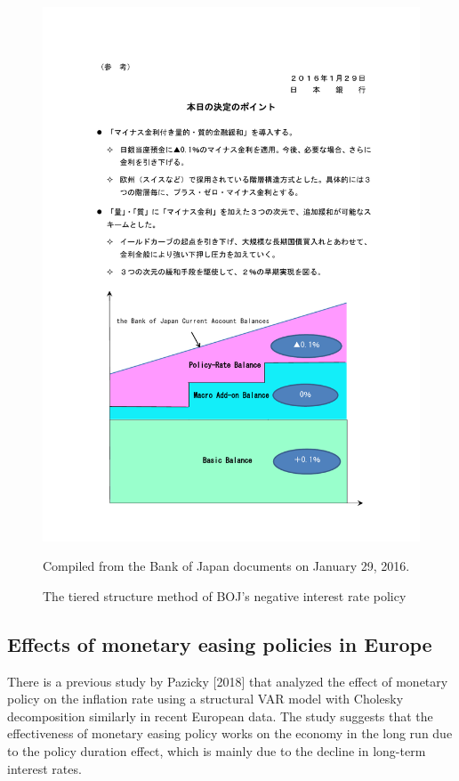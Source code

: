 \documentclass[12pt]{article}
\begin{document}
\begin{figure}[H]
    \centering
    \caption{The tiered structure method of BOJ's negative interest rate policy}
    \includegraphics[width=17cm]{currentaccount.pdf}
    
    Compiled from the Bank of Japan documents on January 29, 2016.
\end{figure}

\newpage
\subsection{Effects of monetary easing policies in Europe}

There is a previous study by Pazicky [2018] that analyzed the effect of monetary policy on the inflation rate using a structural VAR model with Cholesky decomposition similarly in recent European data.
The study suggests that the effectiveness of monetary easing policy works on the economy in the long run due to the policy duration effect, which is mainly due to the decline in long-term interest rates.
\end{document}
